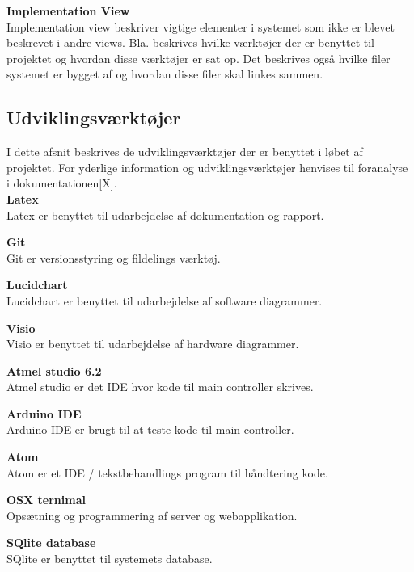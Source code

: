 \textbf{Implementation View}\\
Implementation view beskriver vigtige elementer i systemet som ikke er blevet beskrevet i andre views. Bla. beskrives hvilke værktøjer der er benyttet til projektet og hvordan disse værktøjer er sat op. Det beskrives også hvilke filer systemet er bygget af og hvordan disse filer skal linkes sammen.


\newpage
\subsection{Udviklingsværktøjer}
I dette afsnit beskrives de udviklingsværktøjer der er benyttet i løbet af projektet. For yderlige information og udviklingsværktøjer henvises til foranalyse i dokumentationen[X]. \\

\textbf{Latex}\\
Latex er benyttet til udarbejdelse af dokumentation og rapport. 

\textbf{Git}\\
Git er versionsstyring og fildelings værktøj.

\textbf{Lucidchart}\\
Lucidchart er benyttet til udarbejdelse af software diagrammer.

\textbf{Visio}\\
Visio er benyttet til udarbejdelse af hardware diagrammer.

\textbf{Atmel studio 6.2}\\
Atmel studio er det IDE hvor kode til main controller skrives.

\textbf{Arduino IDE}\\
Arduino IDE er brugt til at teste kode til main controller.

\textbf{Atom}\\
Atom er et IDE / tekstbehandlings program til håndtering kode.

\textbf{OSX ternimal}\\
Opsætning og programmering af server og webapplikation. 

\textbf{SQlite database}\\
SQlite er benyttet til systemets database.